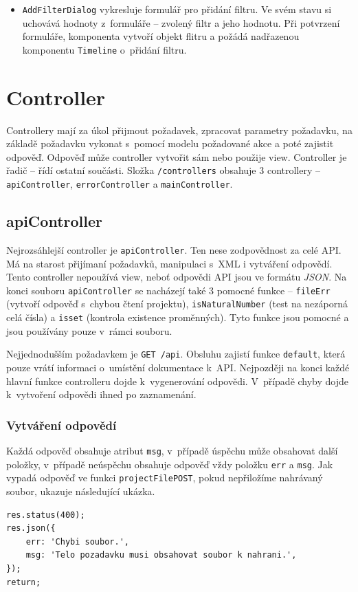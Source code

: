 \begin{itemize}
\item \texttt{AddFilterDialog} vykresluje formulář pro přidání filtru. Ve svém stavu si uchovává hodnoty z~formuláře -- zvolený filtr a jeho hodnotu. Při potvrzení formuláře, komponenta vytvoří objekt flitru a požádá nadřazenou komponentu \texttt{Timeline} o~přidání filtru.
\end{itemize}

\section{Controller}
Controllery mají za úkol přijmout požadavek, zpracovat parametry požadavku, na základě požadavku vykonat s~pomocí modelu požadované akce a poté zajistit odpověď. Odpověď může controller vytvořit sám nebo použije view. Controller je řadič -- řídí ostatní součásti. Složka \texttt{/controllers} obsahuje 3 controllery -- \texttt{apiController}, \texttt{errorController} a \texttt{mainController}.

\subsection{apiController}
Nejrozsáhlejší controller je \texttt{apiController}. Ten nese zodpovědnost za celé API. Má na starost přijímaní požadavků, manipulaci s~XML i vytváření odpovědí. Tento controller nepoužívá view, neboť odpovědi API jsou ve formátu \textit{JSON}. Na konci souboru \texttt{apiController} se nacházejí také 3 pomocné funkce -- \texttt{fileErr} (vytvoří odpověď s~chybou čtení projektu), \texttt{isNaturalNumber} (test na nezáporná celá čísla) a \texttt{isset} (kontrola existence proměnných). Tyto funkce jsou pomocné a jsou používány pouze v~rámci souboru.

Nejjednodušším požadavkem je \texttt{GET /api}. Obsluhu zajistí funkce \texttt{default}, která pouze vrátí informaci o~umístění dokumentace k~API. Nejpozději na konci každé hlavní funkce controlleru dojde k~vygenerování odpovědi. V~případě chyby dojde k~vytvoření odpovědi ihned po zaznamenání.

\subsubsection{Vytváření odpovědí}
Každá odpověď obsahuje atribut \texttt{msg}, v~případě úspěchu může obsahovat další položky, v~případě neúspěchu obsahuje odpověď vždy položku \texttt{err} a \texttt{msg}. Jak vypadá odpověď ve funkci \texttt{projectFilePOST}, pokud nepřiložíme nahrávaný soubor, ukazuje následující ukázka.
\begin{lstlisting}[style=JavaScript]
res.status(400);
res.json({
    err: 'Chybi soubor.',
    msg: 'Telo pozadavku musi obsahovat soubor k nahrani.',
});
return;
\end{lstlisting}

